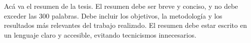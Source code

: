 
\begin{resumen}

Acá va el resumen de la tesis. El resumen debe ser breve y conciso, y no debe exceder las 300 palabras. Debe incluir los objetivos, la metodología y los resultados más relevantes del trabajo realizado. El resumen debe estar escrito en un lenguaje claro y accesible, evitando tecnicismos innecesarios.


\end{resumen}

